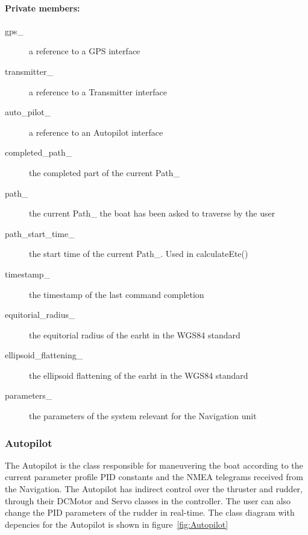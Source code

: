\paragraph{Private members:}
\begin{adjustwidth}{2.5em}{0pt}\begin{description}
		\item [gps_] a reference to a GPS interface
		\item [transmitter_] a reference to a Transmitter interface
		\item [auto_pilot_] a reference to an Autopilot interface
		\item [completed_path_] the completed part of the current Path_
		\item [path_] the current Path_ the boat has been asked to traverse by the user
		\item [path_start_time_] the start time of the current Path_. Used in calculateEte()
		\item [timestamp_] the timestamp of the last command completion
		\item [equitorial_radius_] the equitorial radius of the earht in the WGS84 standard
		\item [ellipsoid_flattening_] the ellipsoid flattening of the earht in the WGS84 standard
		\item [parameters_] the parameters of the system relevant for the Navigation unit
\end{description}\end{adjustwidth}

\subsubsection{Autopilot}

The Autopilot is the class responsible for maneuvering the boat according to the current parameter profile PID constants and the NMEA telegrams received from the Navigation. The Autopilot has indirect control over the thruster and rudder, through their DCMotor and Servo classes in the controller. The user can also change the PID parameters of the rudder in real-time. The class diagram with depencies for the Autopilot is shown in figure~\ref{fig:Autopilot}

